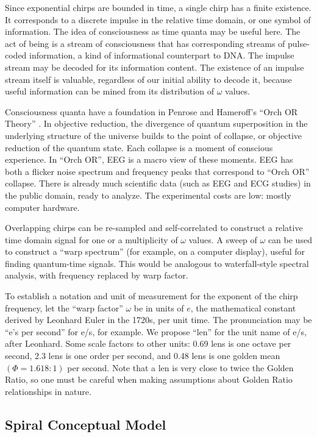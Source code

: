 Since exponential chirps are bounded in time, a single chirp has a finite
existence. It corresponds to a discrete impulse in the relative time domain,
or one symbol of information.
The idea of consciousness as time quanta may be useful here.
The act of being is a stream of consciousness that has corresponding streams
of pulse-coded information, a kind of informational counterpart to DNA.
The impulse stream may be decoded for its information content.
The existence of an impulse stream itself is valuable,
regardless of our initial ability to decode it, because useful information
can be mined from its distribution of $\omega$ values.

Consciousness quanta have a foundation in Penrose and Hameroff's
``Orch OR Theory'' \cite{Hameroff}.
In objective reduction, the divergence of quantum superposition in the
underlying structure of the universe builds to the point of collapse,
or objective reduction of the quantum state.
Each collapse is a moment of conscious experience.
In ``Orch OR'', EEG is a macro view of these moments.
EEG has both a flicker noise spectrum and frequency peaks that correspond
to ``Orch OR'' collapse.
There is already much scientific data (such as EEG and ECG studies) in the
public domain, ready to analyze.
The experimental costs are low: mostly computer hardware.

Overlapping chirps can be re-sampled and self-correlated to construct a relative
time domain signal for one or a multiplicity of $\omega$ values.
A sweep of $\omega$ can be used to construct a ``warp spectrum'' (for example,
on a computer display), useful for finding quantum-time signals.
This would be analogous to waterfall-style spectral analysis, with frequency
replaced by warp factor.

To establish a notation and unit of measurement for the exponent of the chirp
frequency, let the ``warp factor'' $\omega$ be in units of $e$, the
mathematical constant derived by Leonhard Euler in the 1720s, per unit time.
The pronunciation may be ``e's per second'' for e/s, for example.
We propose ``len'' for the unit name of e/s, after Leonhard.
Some scale factors to other units: 0.69 lens is one octave per second,
2.3 lens is one order per second, and 0.48 lens is one golden mean
$(\Phi=1.618:1)$ per second.
Note that a len is very close to twice the Golden Ratio,
so one must be careful when making assumptions about Golden Ratio relationships
in nature.

\subsection{Spiral Conceptual Model}

